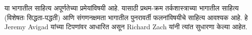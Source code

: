 \documentclass[../../include/open-logic-part]{subfiles}
\begin{document}

\begin{editorial}
 या भागातील साहित्य अपूर्णतेच्या प्रमेयांविषयी आहे. यासाठी
 प्रथम-क्रम तर्कशास्त्राच्या भागातील साहित्य (विशेषतः सिद्धता-पद्धती)
 आणि संगणनक्षमता भागातील पुनरावर्ती फलनांविषयीचे साहित्य आवश्यक आहे.
 हे Jeremy Avigad यांच्या टिपणांवर आधारित असून Richard Zach यांनी त्यांत
 सुधारणा केल्या आहेत.
\end{editorial}






\OLEndPartHook
\end{document}
